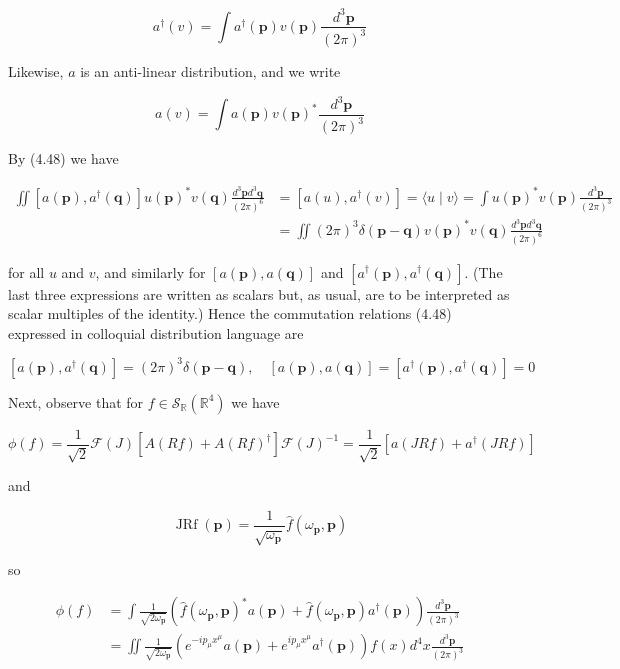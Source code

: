 \documentclass[10pt, letterpaper]{article}
\begin{document}
$$
a^{\dagger}(v)=\int a^{\dagger}(\mathbf{p}) v(\mathbf{p}) \frac{d^{3} \mathbf{p}}{(2 \pi)^{3}}
$$

Likewise, $a$ is an anti-linear distribution, and we write

$$
a(v)=\int a(\mathbf{p}) v(\mathbf{p})^{*} \frac{d^{3} \mathbf{p}}{(2 \pi)^{3}}
$$

By (4.48) we have

$$
\begin{aligned}
\iint\left[a(\mathbf{p}), a^{\dagger}(\mathbf{q})\right] u(\mathbf{p})^{*} v(\mathbf{q}) \frac{d^{3} \mathbf{p} d^{3} \mathbf{q}}{(2 \pi)^{6}} & =\left[a(u), a^{\dagger}(v)\right]=\langle u \mid v\rangle=\int u(\mathbf{p})^{*} v(\mathbf{p}) \frac{d^{3} \mathbf{p}}{(2 \pi)^{3}} \\
& =\iint(2 \pi)^{3} \delta(\mathbf{p}-\mathbf{q}) v(\mathbf{p})^{*} v(\mathbf{q}) \frac{d^{3} \mathbf{p} d^{3} \mathbf{q}}{(2 \pi)^{6}}
\end{aligned}
$$

for all $u$ and $v$, and similarly for $[a(\mathbf{p}), a(\mathbf{q})]$ and $\left[a^{\dagger}(\mathbf{p}), a^{\dagger}(\mathbf{q})\right]$. (The last three expressions are written as scalars but, as usual, are to be interpreted as scalar multiples of the identity.) Hence the commutation relations (4.48) expressed in colloquial distribution language are

$$
\left[a(\mathbf{p}), a^{\dagger}(\mathbf{q})\right]=(2 \pi)^{3} \delta(\mathbf{p}-\mathbf{q}), \quad[a(\mathbf{p}), a(\mathbf{q})]=\left[a^{\dagger}(\mathbf{p}), a^{\dagger}(\mathbf{q})\right]=0
$$

Next, observe that for $f \in \mathcal{S}_{\mathbb{R}}\left(\mathbb{R}^{4}\right)$ we have

$$
\phi(f)=\frac{1}{\sqrt{2}} \mathcal{F}(J)\left[A(R f)+A(R f)^{\dagger}\right] \mathcal{F}(J)^{-1}=\frac{1}{\sqrt{2}}\left[a(J R f)+a^{\dagger}(J R f)\right]
$$

and

$$
\operatorname{JRf}(\mathbf{p})=\frac{1}{\sqrt{\omega_{\mathbf{p}}}} \widehat{f}\left(\omega_{\mathbf{p}}, \mathbf{p}\right)
$$

so

$$
\begin{aligned}
\phi(f) & =\int \frac{1}{\sqrt{2 \omega_{\mathbf{p}}}}\left(\widehat{f}\left(\omega_{\mathbf{p}}, \mathbf{p}\right)^{*} a(\mathbf{p})+\widehat{f}\left(\omega_{\mathbf{p}}, \mathbf{p}\right) a^{\dagger}(\mathbf{p})\right) \frac{d^{3} \mathbf{p}}{(2 \pi)^{3}} \\
& =\iint \frac{1}{\sqrt{2 \omega_{\mathbf{p}}}}\left(e^{-i p_{\mu} x^{\mu}} a(\mathbf{p})+e^{i p_{\mu} x^{\mu}} a^{\dagger}(\mathbf{p})\right) f(x) d^{4} x \frac{d^{3} \mathbf{p}}{(2 \pi)^{3}}
\end{aligned}
$$
\end{document}
